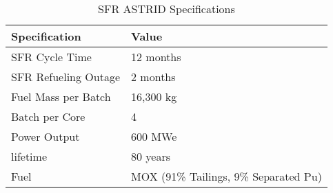 \begin{table}[h]
	\centering
	\begin{tabularx}{\textwidth}{bb}
		\hline
		Specification & Value \\
		\hline
		SFR Cycle Time & 12 months \\ 
		SFR Refueling Outage & 2 months \\
		Fuel Mass per Batch & 16,300 kg \\
		Batch per Core & 4 \\
		Power Output & 600 MWe \\
		lifetime & 80 years \\
		Fuel & {\small \gls{MOX} (91\% Tailings, 9\% Separated Pu)}\\
		\hline
	\end{tabularx}
	\caption {\gls{SFR} ASTRID Specifications}
	\cite{marsaultmarie-sophie_pre-conceptual_2012}
	\label{tab:sfr}
\end{table}

